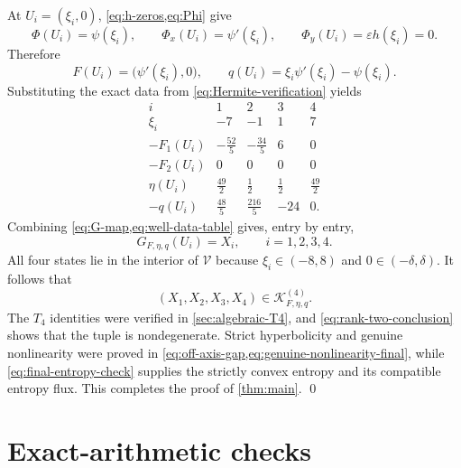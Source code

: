 \documentclass[11pt,reqno]{amsart}
\theoremstyle{definition}
\newcommand{\V}{\mathcal{V}}
\newcommand{\Kprod}{\mathcal{K}}
\begin{document}
At $U_i=(\xi_i,0)$, \cref{eq:h-zeros,eq:Phi} give
\begin{equation}
  \Phi(U_i)=\psi(\xi_i),
  \qquad
  \Phi_x(U_i)=\psi'(\xi_i),
  \qquad
  \Phi_y(U_i)=\varepsilon h(\xi_i)=0.
  \label{eq:jets-at-Ui}
\end{equation}
Therefore
\begin{equation}
  F(U_i)=\bigl(\psi'(\xi_i),0\bigr),
  \qquad
  q(U_i)=\xi_i\psi'(\xi_i)-\psi(\xi_i).
  \label{eq:F-q-at-Ui}
\end{equation}
Substituting the exact data from \cref{eq:Hermite-verification} yields
\begin{equation}
\renewcommand{\arraystretch}{1.25}
\begin{array}{c|rrrr}
  i&1&2&3&4\\
  \hline
  \xi_i&-7&-1&1&7\\
  -F_1(U_i)&-\frac{52}{5}&-\frac{34}{5}&6&0\\[1mm]
  -F_2(U_i)&0&0&0&0\\[1mm]
  \eta(U_i)&\frac{49}{2}&\frac12&\frac12&\frac{49}{2}\\[1mm]
  -q(U_i)&\frac{48}{5}&\frac{216}{5}&-24&0.
\end{array}
\label{eq:well-data-table}
\end{equation}
Combining \cref{eq:G-map,eq:well-data-table} gives, entry by entry,
\begin{equation}
  G_{F,\eta,q}(U_i)=X_i,
  \qquad i=1,2,3,4.
  \label{eq:wells-recovered}
\end{equation}
All four states lie in the interior of $\V$ because
$\xi_i\in(-8,8)$ and $0\in(-\delta,\delta)$.  It follows that
\begin{equation}
  (X_1,X_2,X_3,X_4)
  \in\Kprod_{F,\eta,q}^{(4)}.
\end{equation}
The $T_4$ identities were verified in \cref{sec:algebraic-T4}, and
\cref{eq:rank-two-conclusion} shows that the tuple is nondegenerate.  Strict
hyperbolicity and genuine nonlinearity were proved in
\cref{eq:off-axis-gap,eq:genuine-nonlinearity-final}, while
\cref{eq:final-entropy-check} supplies the strictly convex entropy and its
compatible entropy flux.  This completes the proof of \cref{thm:main}.
\qed

\appendix

\section{Exact-arithmetic checks}
\label{app:exact-checks}
\end{document}
